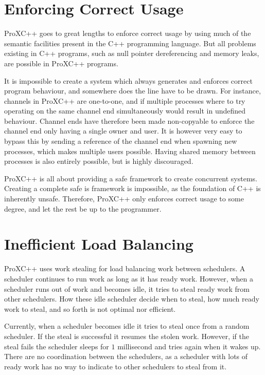 \section{Enforcing Correct Usage}

ProXC++ goes to great lengths to enforce correct usage by using much of the semantic facilities present in the C++ programming language. But all problems existing in C++ programs, such as null pointer dereferencing and memory leaks, are possible in ProXC++ programs.  

It is impossible to create a system which always generates and enforces correct program behaviour, and somewhere does the line have to be drawn. For instance, channels in ProXC++ are one\hyp{}to\hyp{}one, and if multiple processes where to try operating on the same channel end simultaneously would result in undefined behaviour. Channel ends have therefore been made non\hyp{}copyable to enforce the channel end only having a single owner and user. It is however very easy to bypass this by sending a reference of the channel end when spawning new processes, which makes multiple users possible. Having shared memory between processes is also entirely possible, but is highly discouraged.

ProXC++ is all about providing a safe framework to create concurrent systems. Creating a complete safe is framework is impossible, as the foundation of C++ is inherently unsafe. Therefore, ProXC++ only enforces correct usage to some degree, and let the rest be up to the programmer.


\section{Inefficient Load Balancing}

ProXC++ uses work stealing for load balancing work between schedulers. A scheduler continues to run work as long as it has ready work. However, when a scheduler runs out of work and becomes idle, it tries to steal ready work from other schedulers. How these idle scheduler decide when to steal, how much ready work to steal, and so forth is not optimal nor efficient.

Currently, when a scheduler becomes idle it tries to steal once from a random scheduler. If the steal is successful it resumes the stolen work. However, if the steal fails the scheduler sleeps for $1$ millisecond and tries again when it wakes up. There are no coordination between the schedulers, as a scheduler with lots of ready work has no way to indicate to other schedulers to steal from it. 

